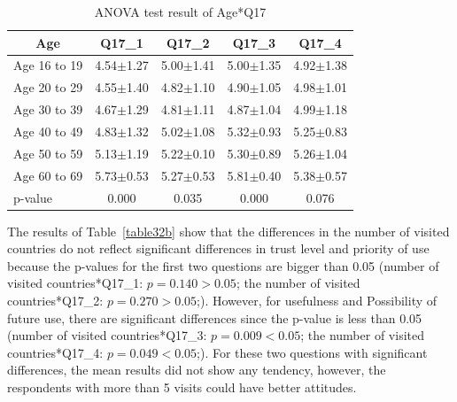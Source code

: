 \begin{table}[h]
  \caption{ANOVA test result of Age*Q17}
  \label{table32a}
  \centering
  \begin{tabular}{l|cccc}
 \hline
        \multicolumn{1}{c|}{Age}          & Q17\_1               & Q17\_2 & Q17\_3    & Q17\_4      \\
\hline
Age 16 to 19 & 4.54$\pm$1.27                    & 5.00$\pm$1.41                    & 5.00$\pm$1.35                    & 4.92$\pm$1.38                    \\
Age 20 to 29 & 4.55$\pm$1.40                    & 4.82$\pm$1.10                    & 4.90$\pm$1.05                    & 4.98$\pm$1.01                    \\
Age 30 to 39 & 4.67$\pm$1.29                    & 4.81$\pm$1.11                    & 4.87$\pm$1.04                    & 4.99$\pm$1.18                    \\
Age 40 to 49 & 4.83$\pm$1.32                    & 5.02$\pm$1.08                    & 5.32$\pm$0.93                    & 5.25$\pm$0.83                    \\
Age 50 to 59 & 5.13$\pm$1.19                    & 5.22$\pm$0.10                    & 5.30$\pm$0.89                    & 5.26$\pm$1.04                    \\
Age 60 to 69 & 5.73$\pm$0.53                    & 5.27$\pm$0.53                    & 5.81$\pm$0.40                    & 5.38$\pm$0.57                    \\
\hline
p-value&           0.000&         0.035&         0.000&   0.076     \\
 \hline
  \end{tabular}
\end{table}



The results of Table~\ref{table32b} show that the differences in the number of visited countries do not reflect significant differences in trust level and priority of use because the p-values for the first two questions are bigger than 0.05 (number of visited countries*Q17\_1: $p=0.140>0.05$; the number of visited countries*Q17\_2: $p=0.270>0.05$;). However, for usefulness and Possibility of future use, there are significant differences since the p-value is less than 0.05 (number of visited countries*Q17\_3: $p=0.009<0.05$; the number of visited countries*Q17\_4: $p=0.049<0.05$;). For these two questions with significant differences, the mean results did not show any tendency, however, the respondents with more than 5 visits could have better attitudes. 


